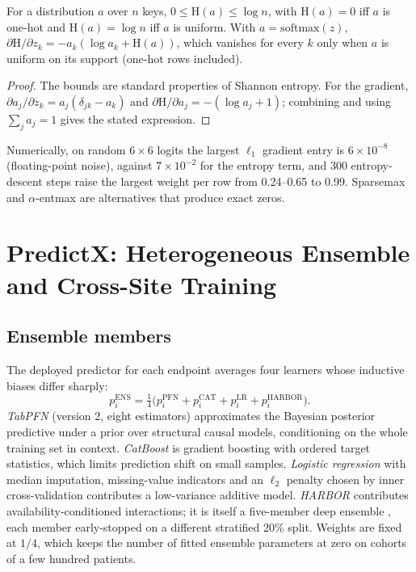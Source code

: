 \begin{proposition}\label{prop:entropy}
For a distribution $a$ over $n$ keys, $0\le\mathrm{H}(a)\le\log n$, with $\mathrm{H}(a)=0$ iff $a$ is one-hot and $\mathrm{H}(a)=\log n$ iff $a$ is uniform. With $a=\mathrm{softmax}(z)$, $\partial\mathrm{H}/\partial z_k=-a_k(\log a_k+\mathrm{H}(a))$, which vanishes for every $k$ only when $a$ is uniform on its support (one-hot rows included).
\end{proposition}
\begin{proof}
The bounds are standard properties of Shannon entropy. For the gradient, $\partial a_j/\partial z_k=a_j(\delta_{jk}-a_k)$ and $\partial\mathrm{H}/\partial a_j=-(\log a_j+1)$; combining and using $\sum_ja_j=1$ gives the stated expression.
\end{proof}
Numerically, on random $6\times6$ logits the largest $\ell_1$ gradient entry is $6\times10^{-8}$ (floating-point noise), against $7\times10^{-2}$ for the entropy term, and 300 entropy-descent steps raise the largest weight per row from 0.24--0.65 to 0.99. Sparsemax and $\alpha$-entmax \cite{martins2016,peters2019} are alternatives that produce exact zeros.

\section{PredictX: Heterogeneous Ensemble and Cross-Site Training}\label{sec:ensemble}
\subsection{Ensemble members}
The deployed predictor for each endpoint averages four learners whose inductive biases differ sharply:
\begin{equation}\label{eq:ens}
p^{\mathrm{ENS}}_i=\tfrac14\big(p^{\mathrm{PFN}}_i+p^{\mathrm{CAT}}_i+p^{\mathrm{LR}}_i+p^{\mathrm{HARBOR}}_i\big).
\end{equation}
\emph{TabPFN} (version 2, eight estimators) \cite{tabpfn,tabpfn2} approximates the Bayesian posterior predictive under a prior over structural causal models, conditioning on the whole training set in context. \emph{CatBoost} \cite{catboost} is gradient boosting with ordered target statistics, which limits prediction shift on small samples. \emph{Logistic regression} with median imputation, missing-value indicators and an $\ell_2$ penalty chosen by inner cross-validation contributes a low-variance additive model. \emph{HARBOR} contributes availability-conditioned interactions; it is itself a five-member deep ensemble \cite{deepensembles}, each member early-stopped on a different stratified 20\% split. Weights are fixed at $1/4$, which keeps the number of fitted ensemble parameters at zero on cohorts of a few hundred patients.

